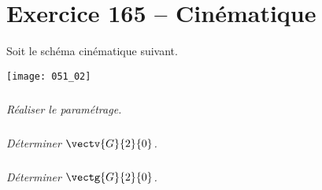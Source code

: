 \section*{Exercice 165 -- Cinématique}
\setcounter{exo}{0}

Soit le schéma cinématique suivant.
\begin{center}
\texttt{[image: 051\_02]}
\end{center}


\subparagraph{}
\textit{Réaliser le paramétrage.}


\subparagraph{}
\textit{Déterminer $\vectv{G}{2}{0}$.}


\subparagraph{}
\textit{Déterminer $\vectg{G}{2}{0}$.}

